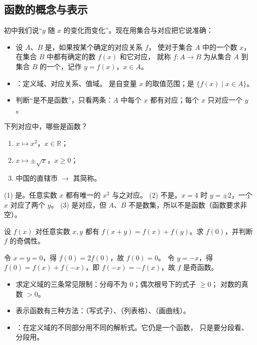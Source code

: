 \begin{explore}

\subsection{函数的概念与表示}

初中我们说“$y$ 随 $x$ 的变化而变化”。现在用集合与对应把它说准确：
\begin{itemize}
  \item 设 $A$、$B$ 是，如果按某个确定的对应关系 $f$，
        使对于集合 $A$ 中的一个数 $x$，在集合 $B$ 中都有确定的数 $f(x)$ 和它对应，
        就称 $f:A\to B$ 为从集合 $A$ 到集合 $B$ 的一个，记作 $y=f(x)$，$x\in A$。
  \item {}：定义域、对应关系、值域。
        是自变量 $x$ 的取值范围；是 $\{f(x)\mid x\in A\}$。
  \item 判断“是不是函数”，只看两条：$A$ 中每个 $x$ 都有对应；每个 $x$ 只对应一个 $y$。
\end{itemize}

\begin{example}
下列对应中，哪些是函数？
\begin{enumerate}
  \item $x\mapsto x^2$，$x\in\mathbb{R}$；
  \item $x\mapsto\pm\sqrt{x}$，$x\geq0$；
  \item 中国的直辖市 $\to$ 其简称。
\end{enumerate}
\end{example}
\begin{solution}
(1) 是。任意实数 $x$ 都有唯一的 $x^2$ 与之对应。
(2) 不是。$x=4$ 时 $y=\pm2$，一个 $x$ 对应了两个 $y$。
(3) 是对应，但 $A$、$B$ 不是数集，所以不是函数（函数要求非空）。
\end{solution}

\begin{problem}
设 $f(x)$ 对任意实数 $x,y$ 都有 $f(x+y)=f(x)+f(y)$。求 $f(0)$，并判断 $f$ 的奇偶性。
\end{problem}
\begin{solution}
令 $x=y=0$，得 $f(0)=2f(0)$，故 $f(0)=0$。
令 $y=-x$，得 $f(0)=f(x)+f(-x)$，即 $f(-x)=-f(x)$，故 $f$ 是奇函数。
\end{solution}

\begin{itemize}
  \item 求定义域的三条常见限制：分母不为 $0$；偶次根号下的式子 $\geq0$；
        对数的真数 $>0$。
  \item 表示函数有三种方法：（写式子）、（列表格）、（画曲线）。
  \item {}：在定义域的不同部分用不同的解析式。它仍是一个函数，
        只是要分段看、分段用。
\end{itemize}


\end{explore}

